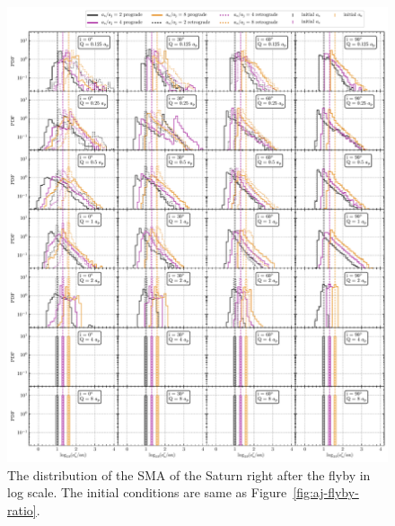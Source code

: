 \documentclass[twocolumn]{aastex63}
\newcommand*\fgr[1]{Figure~\ref{#1}}
\begin{document}
\begin{figure}
    \includegraphics[width=\textwidth]{figs/as-flyby-ratio.pdf}
    \caption{The distribution of the SMA of the Saturn right after the flyby in log scale.  The initial conditions are same as \fgr{fig:aj-flyby-ratio}.} 
    \label{fig:as-flyby-ratio}
\end{figure}
\end{document}
